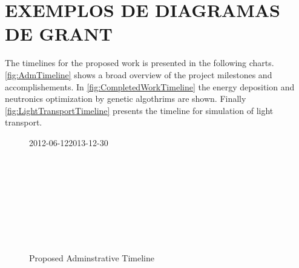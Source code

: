 %	

\section{EXEMPLOS DE DIAGRAMAS DE GRANT}

The timelines for the proposed work is presented in the following charts.
\autoref{fig:AdmTimeline} shows a broad overview of the project milestones and accomplishements.
In \autoref{fig:CompletedWorkTimeline} the energy deposition and neutronics optimization by genetic algothrims are shown.
Finally \autoref{fig:LightTransportTimeline} presents the timeline for simulation of light transport.
\begin{sidewaysfigure}
	\begin{center}
		\begin{ganttchart}[x unit=8.5mm,vgrid,time slot format=isodate,compress calendar,today=2013-08-05,today offset=.5,today label=Current Week,today rule/.style={draw=blue,ultra thick}]{2012-06-12}{2013-12-30}
			 \\
			\\
			\\
			\\
			\\
			\\
			\\
			\\
			\\
		\end{ganttchart}
	\end{center}
	\caption{Proposed Adminstrative Timeline}
	\label{fig:AdmTimeline}
\end{sidewaysfigure}
